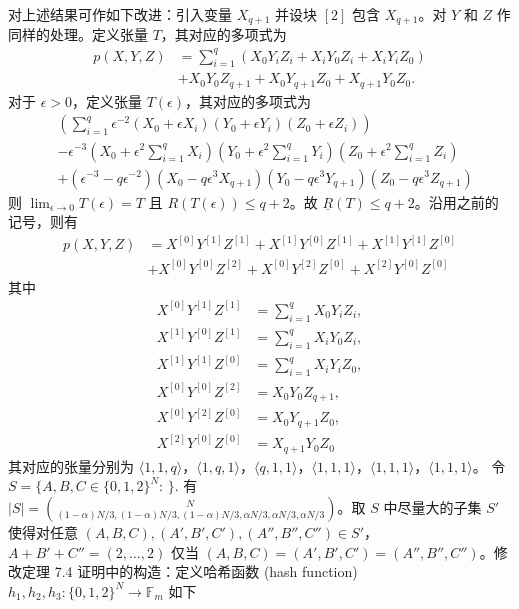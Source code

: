 \documentclass[11pt,fleqn, UTF8]{ctexbook} %
\begin{document}
对上述结果可作如下改进：引入变量 $X_{q+1}$ 并设块 $[2]$ 包含 $X_{q+1}$。对 $Y$ 和 $Z$ 作同样的处理。定义张量 $T$，其对应的多项式为
\begin{align}
p(X,Y,Z)&=\sum_{i=1}^q (X_0Y_iZ_i+X_iY_0Z_i+X_iY_iZ_0)\\
&+X_0Y_0Z_{q+1}+X_0Y_{q+1}Z_0+X_{q+1}Y_0Z_0.
\end{align}
对于 $\epsilon>0$，定义张量 $T(\epsilon)$，其对应的多项式为
\begin{align}
&\left(\sum_{i=1}^q \epsilon^{-2} (X_0+\epsilon X_i)(Y_0+\epsilon Y_i)(Z_0+\epsilon Z_i)\right)\\
&-\epsilon^{-3}\left(X_0+\epsilon^2\sum_{i=1}^q X_i\right)\left(Y_0+\epsilon^2\sum_{i=1}^q Y_i\right)\left(Z_0+\epsilon^2\sum_{i=1}^q Z_i\right)\\
&+\left(\epsilon^{-3}-q\epsilon^{-2}\right)(X_0-q\epsilon^3 X_{q+1})(Y_0-q\epsilon^3 Y_{q+1})(Z_0-q\epsilon^3 Z_{q+1})
\end{align}
则 $\lim_{\epsilon\to 0} T(\epsilon)=T$ 且 $R(T(\epsilon))\leq q+2$。故 $\underline{R}(T)\leq q+2$。沿用之前的记号，则有
\begin{align}
p(X,Y,Z)&=X^{[0]}Y^{[1]}Z^{[1]}+X^{[1]}Y^{[0]}Z^{[1]}+X^{[1]}Y^{[1]}Z^{[0]}\\
&+X^{[0]}Y^{[0]}Z^{[2]}+X^{[0]}Y^{[2]}Z^{[0]}+X^{[2]}Y^{[0]}Z^{[0]}
\end{align}
其中
\begin{align}
X^{[0]}Y^{[1]}Z^{[1]}&=\sum_{i=1}^q X_0Y_iZ_i,\\
X^{[1]}Y^{[0]}Z^{[1]}&=\sum_{i=1}^q X_iY_0Z_i,\\
X^{[1]}Y^{[1]}Z^{[0]}&=\sum_{i=1}^q X_iY_iZ_0,\\
X^{[0]}Y^{[0]}Z^{[2]}&=X_0Y_0Z_{q+1},\\
X^{[0]}Y^{[2]}Z^{[0]}&=X_0Y_{q+1}Z_0,\\
X^{[2]}Y^{[0]}Z^{[0]}&=X_{q+1}Y_0Z_0
\end{align}
其对应的张量分别为 $\langle 1,1,q\rangle$，$\langle 1,q,1\rangle$，$\langle q,1,1\rangle$，$\langle 1,1,1\rangle$，$\langle 1,1,1\rangle$，$\langle 1,1,1\rangle$。
令
$S=\{A,B,C\in \{0,1,2\}^N$:
$\}$.
有 $|S|={N\choose (1-\alpha)N/3,(1-\alpha)N/3,(1-\alpha)N/3,\alpha N/3,\alpha N/3,\alpha N/3}$。取 $S$ 中尽量大的子集 $S'$ 使得对任意 $(A,B,C),(A',B',C'),(A'',B'',C'')\in S'$，$A+B'+C''=(2,\dots,2)$ 仅当 $(A,B,C)=(A',B',C')=(A'',B'',C'')$。修改定理 7.4 证明中的构造：定义哈希函数 (hash function) $h_1,h_2,h_3:\{0,1,2\}^N\to\mathbb{F}_m$ 如下
\end{document}
